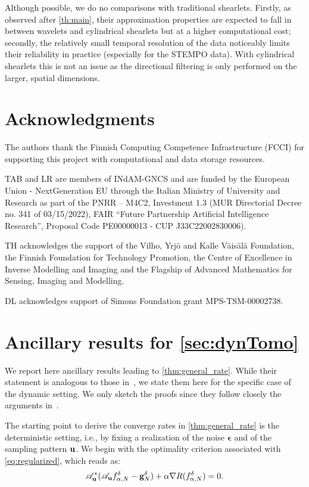 \documentclass[11pt,a4paper]{article}
\numberwithin{equation}{section}
\renewcommand{\vec}[1]{\boldsymbol{#1}} %
\newcommand{\bu}{{\bf u}}
\newcommand{\be}{{\vec{\epsilon}}}
\newcommand{\cAbu}{\mathscr{A}_{\bu}}
\def\fdan{f^\delta_{\alpha,N}}
\def\gdan{{\bf g}^{\delta}_{N}}
\begin{document}
Although possible, we do no comparisons with traditional shearlets. Firstly, as observed after \cref{th:main}, their approximation properties are expected to fall in between wavelets and cylindrical shearlets but at a higher computational cost; secondly, the relatively small temporal resolution of the data noticeably limits their reliability in practice (especially for the STEMPO data). With cylindrical shearlets this is not an issue as the directional filtering is only performed on the larger, spatial dimensions.

\section*{Acknowledgments}
The authors thank the Finnish Computing Competence Infrastructure (FCCI) for supporting this project with computational and data storage resources.

TAB and LR are members of INdAM-GNCS and
are funded by the European Union - NextGeneration EU
through the Italian Ministry of University and Research as part of the PNRR – M4C2, Investment 1.3 (MUR Directorial Decree no. 341 of 03/15/2022), FAIR ``Future Partnership Artificial Intelligence Research'', Proposal Code PE00000013 - CUP J33C22002830006). 

TH acknowledges the support of the Vilho, Yrjö and Kalle Väisälä Foundation, the Finnish Foundation for Technology Promotion, the Centre of Excellence in Inverse Modelling and Imaging and the Flagship of Advanced Mathematics for Sensing, Imaging and Modelling.

DL acknowledges support of Simons Foundation grant MPS-TSM-00002738.

\appendix

\section{Ancillary results for \texorpdfstring{\cref{sec:dynTomo}}{section 3}}\label{ap:ancillaryRes}

We report here ancillary results leading to \cref{thm:general_rate}. While their statement is analogous to those in~\cite{bubba2021,Bubba22}, we state them here for the specific case of the dynamic setting. We only sketch the proofs since they follow closely the arguments in~\cite{bubba2021}.

The starting point to derive the converge rates in \cref{thm:general_rate} is the deterministic setting, i.e., by fixing a realization of the noise $\be$ and of the sampling pattern $\bu$. We begin with the optimality criterion associated with \eqref{eq:regularized}, which reads as:
\begin{equation}
	\label{eq:optimality_criterion}
	\cAbu^* ( \cAbu \fdan - \gdan) + \alpha \nabla R (\fdan) = 0.
\end{equation}
\end{document}
